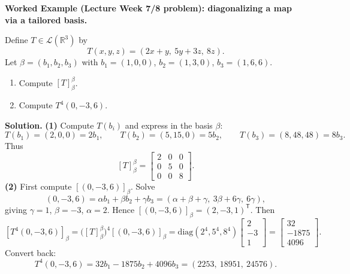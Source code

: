 \begin{examplebox}
\textbf{Worked Example (Lecture Week 7/8 problem): diagonalizing a map via a tailored basis.}

Define $T\in\mathcal{L}(\mathbb{R}^3)$ by
\[
T(x,y,z)=(2x+y,\ 5y+3z,\ 8z).
\]
Let $\beta=(b_1,b_2,b_3)$ with $b_1=(1,0,0)$, $b_2=(1,3,0)$, $b_3=(1,6,6)$.
\begin{enumerate}
\item Compute $[T]^{\beta}_{\beta}$.
\item Compute $T^{4}(0,-3,6)$.
\end{enumerate}

\medskip
\textbf{Solution.}
\textbf{(1)} Compute $T(b_i)$ and express in the basis $\beta$:
\[
T(b_1)=(2,0,0)=2b_1,\qquad
T(b_2)=(5,15,0)=5b_2,\qquad
T(b_3)=(8,48,48)=8b_3.
\]
Thus
\[
[T]^{\beta}_{\beta}=
\begin{bmatrix}
2&0&0\\
0&5&0\\
0&0&8
\end{bmatrix}.
\]
\textbf{(2)} First compute $[(0,-3,6)]_\beta$. Solve
\[
(0,-3,6)=\alpha b_1+\beta b_2+\gamma b_3=(\alpha+\beta+\gamma,\ 3\beta+6\gamma,\ 6\gamma),
\]
giving $\gamma=1$, $\beta=-3$, $\alpha=2$. Hence $[(0,-3,6)]_\beta=(2,-3,1)^{\mathsf T}$.
Then
\[
[T^4(0,-3,6)]_\beta=\bigl([T]^{\beta}_{\beta}\bigr)^4[(0,-3,6)]_\beta
=\mathrm{diag}(2^4,5^4,8^4)\begin{bmatrix}2\\-3\\1\end{bmatrix}
=\begin{bmatrix}32\\-1875\\4096\end{bmatrix}.
\]
Convert back:
\[
T^4(0,-3,6)=32b_1-1875b_2+4096b_3=(2253,\ 18951,\ 24576).
\]
\end{examplebox}

